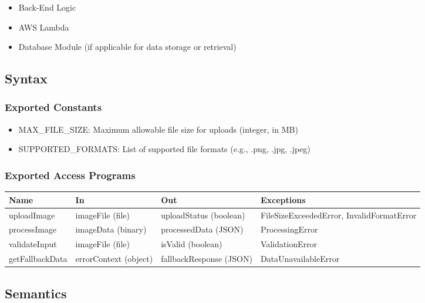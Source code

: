 \documentclass[12pt, titlepage]{article}
\begin{document}
\begin{itemize}
  \item Back-End Logic
  \item AWS Lambda
  \item Database Module (if applicable for data storage or retrieval)
\end{itemize}

\subsection{Syntax}

\subsubsection{Exported Constants}

\begin{itemize}
  \item MAX_FILE_SIZE: Maximum allowable file size for uploads (integer, in MB)
  \item SUPPORTED_FORMATS: List of supported file formats (e.g., .png, .jpg, .jpeg)
\end{itemize}

\subsubsection{Exported Access Programs}

\begin{center}
\begin{tabular}{p{2cm} p{4cm} p{4cm} p{2cm}}
\hline
\textbf{Name} & \textbf{In} & \textbf{Out} & \textbf{Exceptions} \\
\hline
uploadImage & imageFile (file) & uploadStatus (boolean) & FileSizeExceededError, InvalidFormatError \\
\hline
processImage & imageData (binary) & processedData (JSON) & ProcessingError \\
\hline
validateInput & imageFile (file) & isValid (boolean) & ValidationError \\
\hline
getFallbackData & errorContext (object) & fallbackResponse (JSON) & DataUnavailableError \\
\hline
\end{tabular}
\end{center}

\subsection{Semantics}
\end{document}
